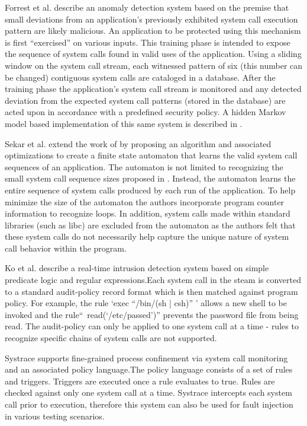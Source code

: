 Forrest et al.\cite{DBLP:conf/sp/ForrestHSL96} describe
an anomaly detection system based on the premise that small deviations from
an application's previously exhibited system call execution pattern are likely
malicious. An application to be protected using this mechanism is first
“exercised” on various inputs. This training phase is intended to expose the
sequence of system calls found in valid uses of the application.
Using a sliding
window on the system call stream,
each witnessed pattern of six (this number can
be changed) contiguous system calls are cataloged in a database. After the
training phase the application's system call stream
is monitored and any detected
deviation from the expected system call patterns (stored in the database) are
acted upon in accordance with a predefined security policy.
A hidden Markov model
based implementation of this same system is described in \cite{DBLP:conf/sp/WarrenderFP99}.

Sekar et al.\cite{DBLP:conf/sp/SekarBDB01} extend the work
of \cite{DBLP:conf/sp/ForrestHSL96} by proposing
an algorithm and associated optimizations
to create a finite state automaton that
learns the valid system call sequences of an application.
The automaton is not
limited to recognizing the small system call sequence sizes proposed in
\cite{DBLP:conf/sp/ForrestHSL96}.
Instead,
the automaton learns the entire
sequence of system calls produced by each
run of the application.
To help minimize the size
of the automaton
the authors incorporate program counter information to recognize
loops.
In addition,
system calls made within standard libraries (such as libc)
are excluded from the automaton
as the authors felt that these system calls do not
necessarily help capture the unique nature of system call behavior within the
program.

Ko et al.\cite{DBLP:conf/acsac/KoFL94} describe a real-time intrusion detection system
based on simple predicate logic and regular expressions.Each system call in the
steam is converted to a standard audit-policy record format which is then
matched against program policy. For example, the rule ‘exec “/bin/(sh | csh)” ’
allows a new shell to be invoked and the rule“~read(‘/etc/passed’)” prevents the
password file from being read. The audit-policy can only be applied to one
system call at a time - rules to recognize specific chains of system calls are
not supported.

Systrace\cite{DBLP:conf/uss/Provos03} supports fine-grained process confinement
via system call monitoring and an associated policy language.The policy language
consists of a set of rules and triggers.
Triggers are executed once a rule
evaluates to true. Rules are checked against only one system call at a time.
Systrace intercepts each system call prior to execution, therefore this system
can also be used for fault injection in various testing scenarios.

